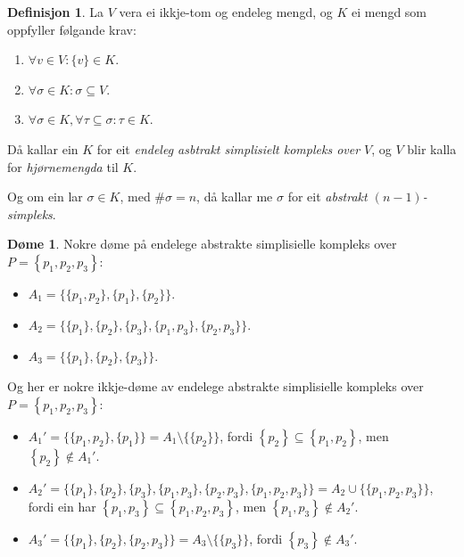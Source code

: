 \documentclass[a4paper, 12pt, norsk]{article}
\theoremstyle{plain}
\theoremstyle{definition}
\newtheorem{definition}[theorem]{Definisjon}
\newtheorem{example}[theorem]{Døme}
\newcommand{\union}{ \mathop{\cup}\limits }
\newcommand{\set}[1]{ \left\{ #1 \right\} } %
\begin{document}
\begin{definition} \label{def:ASK}
	La $V$ vera ei ikkje-tom og endeleg mengd, og \( K \) ei mengd som oppfyller følgande krav: 
	\begin{enumerate}
		\item{$\forall v \in V: \{v\} \in K$.}
		\item{\( \forall \sigma \in K: \sigma \subseteq V \).}
		\item{$\forall \sigma \in K, \forall \tau \subseteq \sigma: \tau \in K$.}
	\end{enumerate}

	Då kallar ein $K$ for eit \emph{endeleg asbtrakt simplisielt kompleks over $V$}, og $V$ blir kalla for \emph{hjørnemengda} til $K$.

	Og om ein lar \( \sigma \in K \), med \( \#\sigma = n \), då kallar me \( \sigma \) for eit \emph{abstrakt \( (n-1) \)-simpleks}.
\end{definition}

\begin{example}
	Nokre døme på endelege abstrakte simplisielle kompleks over \( P=\set{p_1, p_2, p_3} \):

	\begin{itemize}
		\item{$A_1=\{\{p_1, p_2\}, \{p_1\}, \{p_2\}\}$.}
		\item{$A_2=\{\{p_1\}, \{p_2\}, \{p_3\}, \{p_1, p_3\}, \{p_2, p_3\}\}$.}
		\item{$A_3=\{\{p_1\}, \{p_2\}, \{p_3\}\}$.}
	\end{itemize}

	Og her er nokre ikkje-døme av endelege abstrakte simplisielle kompleks over \( P=\set{p_1, p_2, p_3} \):

	\begin{itemize}
		\item{$A_1'=\{\{p_1, p_2\}, \{p_1\}\}=A_1 \setminus \{\{p_2\}\}$, fordi \( \set{p_2} \subseteq \set{p_1, p_2} \), men \( \set{p_2} \not\in A_1' \).}
		\item{$A_2'=\{\{p_1\}, \{p_2\}, \{p_3\}, \{p_1, p_3\}, \{p_2, p_3\}, \{p_1, p_2, p_3\}\}=A_2 \union \{\{p_1, p_2, p_3\}\}$, fordi ein har \( \set{p_1, p_3} \subseteq \set{p_1, p_2, p_3} \), men \( \set{p_1, p_3} \not\in A_2' \).}
		\item{$A_3'=\{\{p_1\}, \{p_2\}, \{p_2, p_3\}\}=A_3 \setminus \{\{p_3\}\}$, fordi \( \set{p_3} \not\in A_3' \).}
	\end{itemize}
\end{example}
\end{document}

